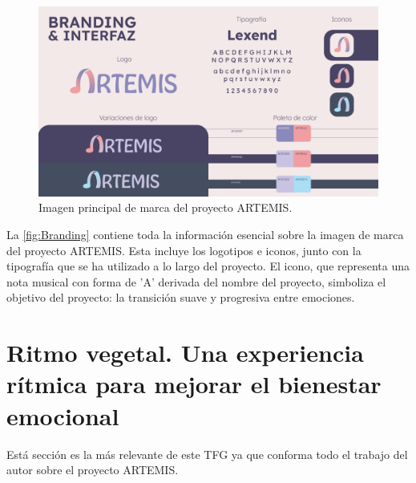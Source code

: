 \begin{figure}[h!]
	\centering
	\includegraphics[width=\linewidth]{Figuras/Desarrollo/Branding.png}
	\caption{Imagen principal de marca del proyecto ARTEMIS.}
	\label{fig:Branding}
\end{figure}

La \autoref{fig:Branding} contiene toda la información esencial sobre la imagen de marca del proyecto ARTEMIS. Esta incluye los logotipos e iconos, junto con la tipografía que se ha utilizado a lo largo del proyecto. El icono, que representa una nota musical con forma de 'A' derivada del nombre del proyecto, simboliza el objetivo del proyecto: la transición suave y progresiva entre emociones.

\section{Ritmo vegetal. Una experiencia rítmica para mejorar el bienestar emocional}

Está sección es la más relevante de este TFG ya que conforma todo el trabajo del autor sobre el proyecto ARTEMIS.


